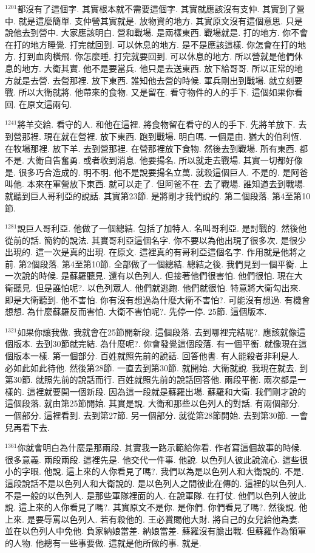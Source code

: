 \documentclass{book}
\begin{document}
$^{1201}$都沒有了這個字.
其實根本就不需要這個字.
其實就應該沒有支仲.
其實到了營中.
就是這麼簡單.
支仲營其實就是.
放物資的地方.
其實原文沒有這個意思.
只是說他去到營中.
大家應該明白.
營和戰場.
是兩樣東西.
戰場就是.
打的地方.
你不會在打的地方睡覺.
打完就回到.
可以休息的地方.
是不是應該這樣.
你怎會在打的地方.
打到血肉橫飛.
你怎麼睡.
打完就要回到.
可以休息的地方.
所以營就是他們休息的地方.
大衛其實.
他不是要當兵.
他只是去送東西.
放下給哥哥.
所以正常的地方就是去營.
去營那裡.
放下東西.
誰知他去營的時候.
軍兵剛出到戰場.
就立刻要戰.
所以大衛就將.
他帶來的食物.
又是留在.
看守物件的人的手下.
這個如果你看回.
在原文這兩句.

$^{1241}$將羊交給.
看守的人.
和他在這裡.
將食物留在看守的人的手下.
先將羊放下.
去到營那裡.
現在就在營裡.
放下東西.
跑到戰場.
明白嗎.
一個是由.
猶大的伯利恆.
在牧場那裡.
放下羊.
去到營那裡.
在營那裡放下食物.
然後去到戰場.
所有東西.
都不是.
大衛自告奮勇.
或者收到消息.
他要揚名.
所以就走去戰場.
其實一切都好像是.
很多巧合造成的.
明不明.
他不是說要揚名立萬.
就殺這個巨人.
不是的.
是阿爸叫他.
本來在軍營放下東西.
就可以走了.
但阿爸不在.
去了戰場.
誰知道去到戰場.
就聽到巨人哥利亞的說話.
其實第23節.
是將剛才我們說的.
第二個段落.
第4至第10節.

$^{1281}$說巨人哥利亞.
他做了一個總結.
包括了加特人.
名叫哥利亞.
是討戰的.
然後他從前的話.
簡約的說法.
其實哥利亞這個名字.
你不要以為他出現了很多次.
是很少出現的.
這一次是真的出現.
在原文.
這裡真的有哥利亞這個名字.
作用就是他將之前.
第2個段落.
第4至第10節.
全部做了一個總結.
總結之後.
我們見到一個平衡.
上一次說的時候.
是蘇羅聽見.
還有以色列人.
但接著他們很害怕.
他們很怕.
現在大衛聽見.
但是誰怕呢?.
以色列眾人.
他們就逃跑.
他們就很怕.
特意將大衛勾出來.
即是大衛聽到.
他不害怕.
你有沒有想過為什麼大衛不害怕?.
可能沒有想過.
有機會想想.
為什麼蘇羅反而害怕.
大衛不害怕呢?.
先停一停.
25節.
這個版本.

$^{1321}$如果你讓我做.
我就會在25節開新段.
這個段落.
去到哪裡完結呢?.
應該就像這個版本.
去到30節就完結.
為什麼呢?.
你會發覺這個段落.
有一個平衡.
就像現在這個版本一樣.
第一個部分.
百姓就照先前的說話.
回答他書.
有人能殺者非利是人.
必如此如此待他.
然後第28節.
一直去到第30節.
就開始.
大衛就說.
我現在就去.
到第30節.
就照先前的說話而行.
百姓就照先前的說話回答他.
兩段平衡.
兩次都是一樣的.
這裡就要開一個新段.
因為這一段就是蘇羅出場.
蘇羅和大衛.
我們剛才說的這個段落.
就由第25節開始.
其實是說.
大衛和那些以色列人的對話.
有兩個部分.
一個部分.
這裡看到.
去到第27節.
另一個部分.
就從第28節開始.
去到第30節.
一會兒再看下去.

$^{1361}$你就會明白為什麼是那兩段.
其實我一路示範給你看.
作者寫這個故事的時候.
很多意義.
兩段兩段.
這裡先是.
他交代一件事.
他說.
以色列人彼此說流心.
這些很小的字眼.
他說.
這上來的人你看見了嗎?.
我們以為是以色列人和大衛說的.
不是.
這段說話不是以色列人和大衛說的.
是以色列人之間彼此在傳的.
這裡的以色列人.
不是一般的以色列人.
是那些軍隊裡面的人.
在說軍隊.
在打仗.
他們以色列人彼此說.
這上來的人你看見了嗎?.
其實原文不是你.
是你們.
你們看見了嗎?.
然後說.
他上來.
是要辱罵以色列人.
若有殺他的.
王必賞賜他大財.
將自己的女兒給他為妻.
並在以色列人中免他.
負家納娘當差.
納娘當差.
蘇羅沒有膽出戰.
但蘇羅作為領軍的人物.
他總有一些事要做.
這就是他所做的事.
就是.
\end{document}
